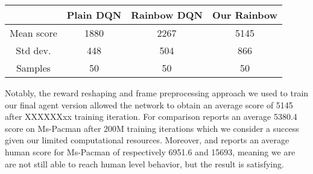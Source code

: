 \documentclass[10pt,twocolumn,letterpaper]{article}
\begin{document}
\begin{center}
	\begin{tabular}{ |c|c|c|c| } 
		\hline
		 & Plain DQN & Rainbow DQN & Our Rainbow \\ 
		 \hline
		Mean score & 1880 & 2267 & 5145 \\
		Std dev. & 448 & 504 & 866 \\
		Samples & 50 & 50 & 50 \\
		\hline
	\end{tabular}
	\label{tab:pacman_results}
\end{center}

Notably, the reward reshaping and frame preprocessing approach we used to train our final agent version allowed the network to obtain an average score of 5145 after XXXXXXxx training iteration. For comparison \cite{DBLP:journals/corr/abs-1710-02298} reports an average 5380.4 score on Ms-Pacman after 200M training iterations which we consider a success given our limited computational resources.
Moreover, \cite{DBLP:journals/corr/WangFL15} and \cite{humancontrol} reports an average human score for Ms-Pacman of respectively 6951.6 and 15693, meaning we are are not still able to reach human level behavior, but the result is satisfying.

{\small


}
\end{document}
